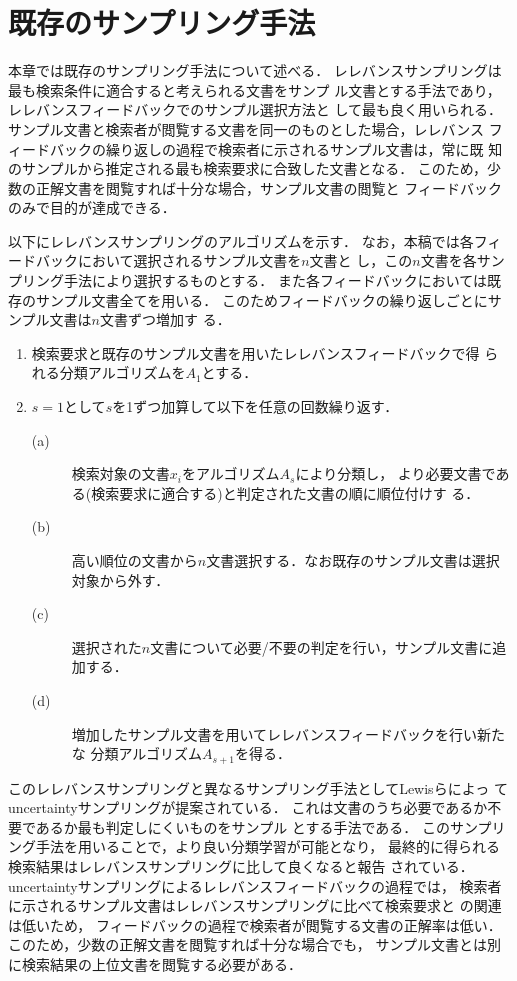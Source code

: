 \section{既存のサンプリング手法}
本章では既存のサンプリング手法について述べる．
レレバンスサンプリングは最も検索条件に適合すると考えられる文書をサンプ
ル文書とする手法であり，レレバンスフィードバックでのサンプル選択方法と
して最も良く用いられる．
サンプル文書と検索者が閲覧する文書を同一のものとした場合，レレバンス
フィードバックの繰り返しの過程で検索者に示されるサンプル文書は，常に既
知のサンプルから推定される最も検索要求に合致した文書となる．
このため，少数の正解文書を閲覧すれば十分な場合，サンプル文書の閲覧と
フィードバックのみで目的が達成できる．

以下にレレバンスサンプリングのアルゴリズムを示す．
なお，本稿では各フィードバックにおいて選択されるサンプル文書を$n$文書と
し，この$n$文書を各サンプリング手法により選択するものとする．
また各フィードバックにおいては既存のサンプル文書全てを用いる．
このためフィードバックの繰り返しごとにサンプル文書は$n$文書ずつ増加す
る．

\renewcommand{\theenumii}{}
\begin{enumerate}
\item 検索要求と既存のサンプル文書を用いたレレバンスフィードバックで得
られる分類アルゴリズムを$A_{1}$とする．
\item $s=1$として$s$を1ずつ加算して以下を任意の回数繰り返す．
\begin{description}
\item[(a)] 検索対象の文書$x_{i}$をアルゴリズム$A_{s}$により分類し，
より必要文書である(検索要求に適合する)と判定された文書の順に順位付けす
る．
\item[(b)] 高い順位の文書から$n$文書選択する．なお既存のサンプル文書は選択
対象から外す．
\item[(c)] 選択された$n$文書について必要/不要の判定を行い，サンプル文書に追
加する．
\item[(d)] 増加したサンプル文書を用いてレレバンスフィードバックを行い新たな
分類アルゴリズム$A_{s+1}$を得る．
\end{description}
\end{enumerate}

このレレバンスサンプリングと異なるサンプリング手法としてLewisらによっ
てuncertaintyサンプリングが提案されている\cite{bib:DLewis}．
これは文書のうち必要であるか不要であるか最も判定しにくいものをサンプル
とする手法である．
このサンプリング手法を用いることで，より良い分類学習が可能となり，
最終的に得られる検索結果はレレバンスサンプリングに比して良くなると報告
されている．
uncertaintyサンプリングによるレレバンスフィードバックの過程では，
検索者に示されるサンプル文書はレレバンスサンプリングに比べて検索要求と
の関連は低いため，
フィードバックの過程で検索者が閲覧する文書の正解率は低い．
このため，少数の正解文書を閲覧すれば十分な場合でも，
サンプル文書とは別に検索結果の上位文書を閲覧する必要がある．

